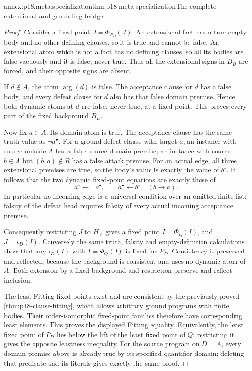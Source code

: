 \begin{annexitem}{annex:p18.meta.specialization}{thm:p18-meta-specialization}{The complete extensional and grounding bridge}
\begin{proof}
Consider a fixed point \(J=\Phi_{P_D}(J)\).
An extensional fact has a true empty body and no other
defining clauses, so it is true and cannot be false.
An extensional atom which is not a fact has no defining
clauses, so all its bodies are false vacuously and it
is false, never true. Thus all the extensional signs
in \(B_D\) are forced, and their opposite signs are
absent.

If \(d\notin A\), the atom \(\operatorname{arg}(d)\)
is false. The acceptance clause for \(d\) has a false
body, and every defeat clause for \(d\) also has that
false domain premise. Hence both dynamic atoms at
\(d\) are false, never true, at a fixed point.
This proves every part of the fixed background \(B_D\).

Now fix \(a\in A\). Its domain atom is true.
The acceptance clause has the same truth value as
\(\neg a^\bullet\). For a ground defeat clause with
target \(a\), an instance with source outside \(A\)
has a false source-domain premise; an instance with
source \(b\in A\) but \((b,a)\notin R\) has a false
attack premise. For an actual edge, all three
extensional premises are true, so the body's value
is exactly the value of \(b^\circ\).
It follows that the two dynamic fixed-point equations
are exactly those of
\[
          a^\circ\leftarrow\neg a^\bullet,\qquad
          a^\bullet\leftarrow b^\circ\quad(b\to a).
\]
In particular no incoming edge is a universal
condition over an omitted finite list: falsity of
the defeat head requires falsity of every actual
incoming acceptance premise.

Consequently restricting \(J\) to \(H_{\mathcal F}\)
gives a fixed point \(I=\Phi_Q(I)\), and
\(J=\iota_D(I)\). Conversely the same truth, falsity
and empty-definition calculations show that any
\(\iota_D(I)\) with \(I=\Phi_Q(I)\) is fixed for \(P_D\).
Consistency is preserved and reflected, because the
background is consistent and uses no dynamic atom
of \(A\). Both extension by a fixed background and
restriction preserve and reflect inclusion.

The least Fitting fixed points exist and are consistent
by the previously proved \cref{thm:p18-clause-fitting},
which allows arbitrary ground programs with finite
bodies. Their order-isomorphic fixed-point families
therefore have corresponding least elements. This
proves the displayed Fitting equality. Equivalently,
the least fixed point of \(P_D\) lies below the lift
of the least fixed point of \(Q\); restricting it
gives the opposite leastness inequality.
For the source program on \(D=A\), every domain
premise above is already true by its specified
quantifier domain; deleting that predicate and its
literals gives exactly the same proof.
\end{proof}
\end{annexitem}

